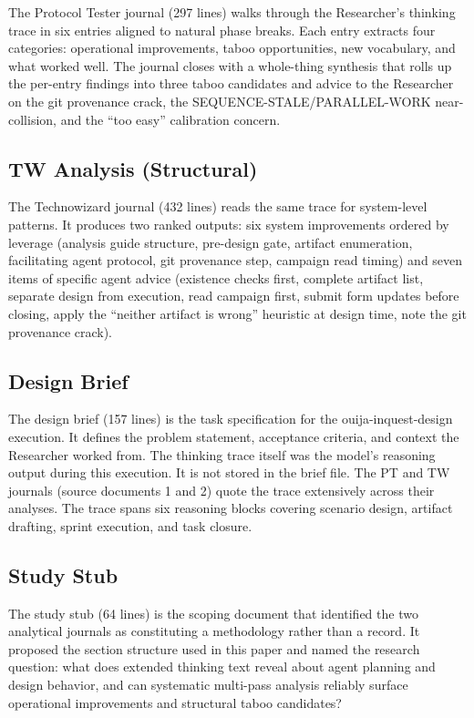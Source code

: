 \documentclass[11pt,a4paper]{article}
\begin{document}
The Protocol Tester journal (297 lines) walks through the Researcher's thinking
trace in six entries aligned to natural phase breaks. Each entry extracts four
categories: operational improvements, taboo opportunities, new vocabulary, and
what worked well. The journal closes with a whole-thing synthesis that rolls up
the per-entry findings into three taboo candidates and advice to the Researcher
on the git provenance crack, the SEQUENCE-STALE/PARALLEL-WORK near-collision, and the ``too easy''
calibration concern.

\subsection{TW Analysis (Structural)}

The Technowizard journal (432 lines) reads the same trace for system-level
patterns. It produces two ranked outputs: six system improvements ordered by
leverage (analysis guide structure, pre-design gate, artifact enumeration,
facilitating agent protocol, git provenance step, campaign read timing) and
seven items of specific agent advice (existence checks first, complete artifact
list, separate design from execution, read campaign first, submit form updates
before closing, apply the ``neither artifact is wrong'' heuristic at design
time, note the git provenance crack).

\subsection{Design Brief}

The design brief (157 lines) is the task specification for the
ouija-inquest-design execution. It defines the problem statement, acceptance
criteria, and context the Researcher worked from. The thinking trace itself was
the model's reasoning output during this execution. It is not stored in the
brief file. The PT and TW journals (source documents 1 and 2) quote the trace
extensively across their analyses. The trace spans six reasoning blocks
covering scenario design, artifact drafting, sprint execution, and task
closure.

\subsection{Study Stub}

The study stub (64 lines) is the scoping document that identified the two
analytical journals as constituting a methodology rather than a record. It
proposed the section structure used in this paper and named the research
question: what does extended thinking text reveal about agent planning and
design behavior, and can systematic multi-pass analysis reliably surface
operational improvements and structural taboo candidates?
\end{document}
